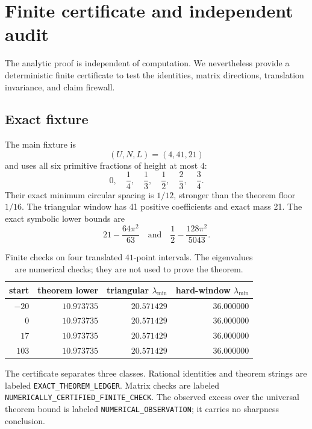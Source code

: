 \section{Finite certificate and independent audit}
\label{sec:audit}

The analytic proof is independent of computation.  We nevertheless provide a
deterministic finite certificate to test the identities, matrix directions,
translation invariance, and claim firewall.

\subsection{Exact fixture}

The main fixture is
\[
(U,N,L)=(4,41,21)
\]
and uses all six primitive fractions of height at most \(4\):
\[
0,\quad\frac14,\quad\frac13,\quad\frac12,\quad\frac23,\quad\frac34.
\]
Their exact minimum circular spacing is \(1/12\), stronger than the theorem
floor \(1/16\).  The triangular window has 41 positive coefficients and exact
mass 21.  The exact symbolic lower bounds are
\[
21-\frac{64\pi^2}{63}
\quad\text{and}\quad
\frac12-\frac{128\pi^2}{5043}.
\]

\begin{table}[ht]
\centering
\caption{Finite checks on four translated \(41\)-point intervals.  The
eigenvalues are numerical checks; they are not used to prove the theorem.}
\label{tab:fixture}
\begin{tabular}{@{}rrrr@{}}
\toprule
start & theorem lower & triangular \(\lambda_{\min}\) &
hard-window \(\lambda_{\min}\)\\
\midrule
\(-20\) & \(10.973735\) & \(20.571429\) & \(36.000000\)\\
\(0\)   & \(10.973735\) & \(20.571429\) & \(36.000000\)\\
\(17\)  & \(10.973735\) & \(20.571429\) & \(36.000000\)\\
\(103\) & \(10.973735\) & \(20.571429\) & \(36.000000\)\\
\bottomrule
\end{tabular}
\end{table}

The certificate separates three classes.  Rational identities and theorem
strings are labeled \texttt{EXACT\_THEOREM\_LEDGER}.  Matrix checks are labeled
\texttt{NUMERICALLY\_CERTIFIED\_FINITE\_CHECK}.  The observed excess over the
universal theorem bound is labeled \texttt{NUMERICAL\_OBSERVATION}; it carries
no sharpness conclusion.

